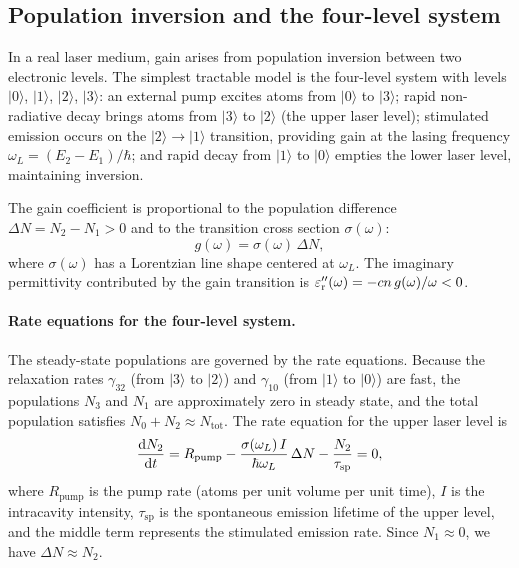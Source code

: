 \subsection{Population inversion and the four-level system}
\label{ssec:population-inversion}

In a real laser medium, gain arises from population inversion between
two electronic levels. The simplest tractable model is the four-level
system with levels $|0\rangle$, $|1\rangle$, $|2\rangle$, $|3\rangle$:
an external pump excites atoms from $|0\rangle$ to $|3\rangle$; rapid
non-radiative decay brings atoms from $|3\rangle$ to $|2\rangle$ (the
upper laser level); stimulated emission occurs on the
$|2\rangle \to |1\rangle$ transition, providing gain at the lasing
frequency $\omega_L = (E_2 - E_1)/\hbar$; and rapid decay from
$|1\rangle$ to $|0\rangle$ empties the lower laser level, maintaining
inversion.

The gain coefficient is proportional to the population difference
$\Delta N = N_2 - N_1 > 0$ and to the transition cross section
$\sigma(\omega)$:
\begin{equation}
 g(\omega) = \sigma(\omega)\,\Delta N,
 \label{eq:gain-coefficient}
\end{equation}
where $\sigma(\omega)$ has a Lorentzian line shape centered at $\omega_L$.
The imaginary permittivity contributed by the gain transition is
$\varepsilon_{\mathrm{r}}''(\omega) = -cn\, g(\omega)/\omega < 0$.

\paragraph{Rate equations for the four-level system.}
The steady-state populations are governed by the rate equations.
Because the relaxation rates $\gamma_{32}$ (from $|3\rangle$ to
$|2\rangle$) and $\gamma_{10}$ (from $|1\rangle$ to $|0\rangle$) are
fast, the populations $N_3$ and $N_1$ are approximately zero in steady
state, and the total population satisfies $N_0 + N_2 \approx N_{\mathrm{tot}}$.
The rate equation for the upper laser level is
\begin{equation}
 \frac{\mathop{}\!\mathrm{d} N_2}{\mathop{}\!\mathrm{d} t} = R_{\mathrm{pump}} - \frac{\sigma(\omega_L)\,I}{\hbar\omega_L}\,\Delta N
 - \frac{N_2}{\tau_{\mathrm{sp}}} = 0,
 \label{eq:rate-equation-n2}
\end{equation}
where $R_{\mathrm{pump}}$ is the pump rate (atoms per unit volume per
unit time), $I$ is the intracavity intensity, $\tau_{\mathrm{sp}}$ is
the spontaneous emission lifetime of the upper level, and the middle
term represents the stimulated emission rate. Since
$N_1 \approx 0$, we have $\Delta N \approx N_2$.


